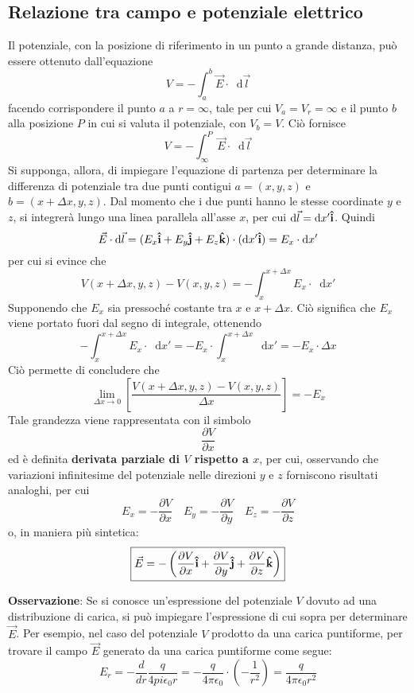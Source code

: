 \documentclass[a4paper]{extarticle}
\newcommand\dif{\mathop{}\!\mathrm{d}}
\begin{document}
\subsection{Relazione tra campo e potenziale elettrico}
Il potenziale, con la posizione di riferimento in un punto a grande distanza, può essere ottenuto dall'equazione
\[V=-\int_a^b\vec E \cdot \dif \vec l\]
facendo corrispondere il punto $a$ a $r=\infty$, tale per cui $V_a=V_r=\infty$ e il punto $b$ alla posizione $P$ in cui si valuta il potenziale, con $V_b=V$. Ciò fornisce
\[V=-\int_\infty^P \vec E \cdot \dif \vec l\]
Si supponga, allora, di impiegare l'equazione di partenza per determinare la differenza di potenziale tra due punti contigui $a=(x,y,z)$ e $b=(x+\Delta x,y,z)$. Dal momento che i due punti hanno le stesse coordinate $y$ e $z$, si integrerà lungo una linea parallela all'asse $x$, per cui $\dif \vec l = \dif x' {\bf{\hat i}}$. Quindi
\[\vec E \cdot \dif \vec l = (E_x {\bf{\hat i}} + E_y {\bf{\hat j}} + E_z {\bf{\hat k}}) \cdot (\dif x' {\bf{\hat i}}) = E_x \cdot \dif x'\]
per cui si evince che
\[V(x+\Delta x,y,z)-V(x,y,z)=-\int_x^{x+\Delta x} E_x \cdot \dif x'\]
Supponendo che $E_x$ sia pressoché costante tra $x$ e $x+\Delta x$. Ciò significa che $E_x$ viene portato fuori dal segno di integrale, ottenendo
\[-\int_x^{x+\Delta x} E_x \cdot \dif x' = - E_x \cdot \int_x^{x+\Delta x} \dif x' = -E_x \cdot \Delta x\]
Ciò permette di concludere che
\[\lim_{\Delta x \to 0} \left[\frac{V(x+\Delta x,y,z)-V(x,y,z)}{\Delta x}\right]=-E_x\]
Tale grandezza viene rappresentata con il simbolo
\[\frac{\partial V}{\partial x}\]
ed è definita \textbf{derivata parziale di $V$ rispetto a $x$}, per cui, osservando che variazioni infinitesime del potenziale nelle direzioni $y$ e $z$ forniscono risultati analoghi, per cui
\[E_x=-\frac{\partial V}{\partial x} \hspace{1em} E_y=-\frac{\partial V}{\partial y} \hspace{1em} E_z=-\frac{\partial V}{\partial z}\]
o, in maniera più sintetica:
\[\boxed{\vec E = - \left(\frac{\partial V}{\partial x} {\bf{\hat i}} + \frac{\partial V}{\partial y} {\bf{\hat j}} + \frac{\partial V}{\partial z} {\bf{\hat k}}\right)}\]

\vspace{1em}
\noindent
\textbf{Osservazione}: Se si conosce un'espressione del potenziale $V$ dovuto ad una distribuzione di carica, si può impiegare l'espressione di cui sopra per determinare $\vec E$. Per esempio, nel caso del potenziale $V$ prodotto da una carica puntiforme, per trovare il campo $\vec E$ generato da una carica puntiforme come segue:
\[E_r = - \frac{d}{dr} \frac{q}{4 pi \epsilon_0 r} = -\frac{q}{4 \pi \epsilon_0} \cdot \left(-\frac{1}{r^2}\right) = \frac{q}{4 \pi \epsilon_0 r^2}\]
\end{document}
